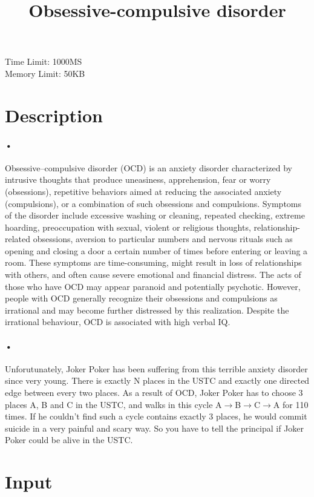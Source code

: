 \documentclass{article}
\title {Obsessive-compulsive disorder}
\date{}
\begin{document}
	\maketitle
	\begin{center}
	Time Limit: 1000MS\\
	Memory Limit: 50KB
	\end{center}
	\section*{Description}
	\paragraph*{•}
	Obsessive–compulsive disorder (OCD) is an anxiety disorder characterized by intrusive thoughts that produce uneasiness, apprehension, fear or worry (obsessions), repetitive behaviors aimed at reducing the associated anxiety (compulsions), or a combination of such obsessions and compulsions. Symptoms of the disorder include excessive washing or cleaning, repeated checking, extreme hoarding, preoccupation with sexual, violent or religious thoughts, relationship-related obsessions, aversion to particular numbers and nervous rituals such as opening and closing a door a certain number of times before entering or leaving a room. These symptoms are time-consuming, might result in loss of relationships with others, and often cause severe emotional and financial distress. The acts of those who have OCD may appear paranoid and potentially psychotic. However, people with OCD generally recognize their obsessions and compulsions as irrational and may become further distressed by this realization. Despite the irrational behaviour, OCD is associated with high verbal IQ.
	\paragraph*{•}
	Unforutunately, Joker Poker has been suffering from this terrible anxiety disorder since very young. There is exactly N places in the USTC and exactly one directed edge between every two places. As a result of OCD, Joker Poker has to choose 3 places A, B and C in the USTC, and walks in this cycle A${\rightarrow}$B${\rightarrow}$C${\rightarrow}$A for 110 times. If he couldn't find such a cycle contains exactly 3 places, he would  commit suicide in a very painful and scary way. So you have to tell the principal if Joker Poker could be alive in the USTC.
	
	\section*{Input}
\end{document}
